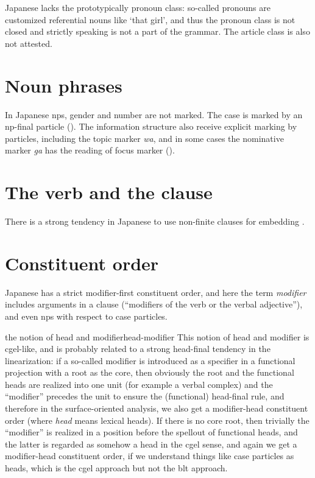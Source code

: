 \documentclass[UTF8, a4paper, oneside, scheme=plain]{ctexrep}
\newcommand*{\term}[1]{\emph{#1}}
\newcommand{\corpus}[1]{\emph{#1}}
\newcommand{\translate}[1]{`#1'}
\begin{document}
Japanese lacks the prototypically pronoun class:
so-called pronouns are customized referential nouns like \translate{that girl},
and thus the pronoun class is not closed and strictly speaking is not a part of the grammar.
The article class is also not attested.

\section{Noun phrases}

In Japanese \acs{np}s, gender and number are not marked.
The case is marked by an \ac{np}-final particle ().
The information structure also receive explicit marking by particles,
including the topic marker \corpus{wa}, 
and in some cases the nominative marker \corpus{ga} has the reading of focus marker
().

\section{The verb and the clause}

There is a strong tendency in Japanese to use non-finite clauses for embedding \citep{kayne2003antisymmetry}.

\section{Constituent order}\label{sec:constituent-order}

Japanese has a strict modifier-first constituent order,
and here the term \term{modifier} includes 
arguments in a clause (``modifiers of the verb or the verbal adjective''),
and even \acs{np}s with respect to case particles.

\begin{theorybox}{the notion of head and modifier}{head-modifier}
    This notion of head and modifier is \acs{cgel}-like, 
    and is probably related to a strong head-final tendency in the linearization:
    if a so-called modifier is introduced as a specifier 
    in a functional projection with a root as the core,
    then obviously the root and the functional heads are realized into one unit (for example a verbal complex) 
    and the ``modifier'' precedes the unit to ensure the (functional) head-final rule,
    and therefore in the surface-oriented analysis,
    we also get a modifier-head constituent order (where \term{head} means lexical heads).
    If there is no core root,
    then trivially the ``modifier'' is realized in a position before the spellout of functional heads,
    and the latter is regarded as somehow a head in the \acs{cgel} sense,
    and again we get a modifier-head constituent order,
    if we understand things like case particles as heads,
    which is the \ac{cgel} approach but not the \acs{blt} approach.
\end{theorybox}
\end{document}
